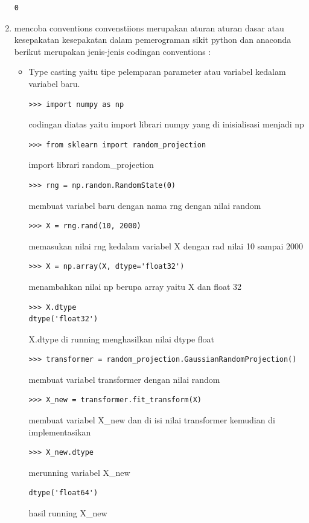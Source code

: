 \begin{enumerate}
\begin{verbatim}
0
\end{verbatim}
\item
mencoba conventions
convenstiions merupakan aturan aturan dasar atau kesepakatan kesepakatan dalam pemerograman sikit python dan anaconda berikut merupakan jenis-jenis codingan conventions :
\begin{itemize}
\item
Type casting yaitu tipe pelemparan parameter atau variabel kedalam variabel baru.
\begin{verbatim}
>>> import numpy as np
\end{verbatim}
codingan diatas yaitu import librari numpy yang di inisialisasi menjadi np
\begin{verbatim}
>>> from sklearn import random_projection
\end{verbatim}
import librari random\_projection
\begin{verbatim}
>>> rng = np.random.RandomState(0)
\end{verbatim}
membuat variabel baru dengan nama rng dengan nilai random
\begin{verbatim}
>>> X = rng.rand(10, 2000)
\end{verbatim}
memasukan nilai rng kedalam variabel X dengan rad nilai 10 sampai 2000
\begin{verbatim}
>>> X = np.array(X, dtype='float32')
\end{verbatim}
menambahkan nilai np berupa array yaitu X dan float 32 
\begin{verbatim}
>>> X.dtype
dtype('float32')
\end{verbatim}
X.dtype di running menghasilkan nilai dtype float
\begin{verbatim}
>>> transformer = random_projection.GaussianRandomProjection()
\end{verbatim}
membuat variabel transformer dengan nilai random
\begin{verbatim}
>>> X_new = transformer.fit_transform(X)
\end{verbatim}
membuat variabel X\_new dan di isi nilai transformer kemudian di implementasikan 
\begin{verbatim}
>>> X_new.dtype
\end{verbatim}
merunning variabel X\_new
\begin{verbatim}
dtype('float64')
\end{verbatim}
hasil running X\_new



\end{itemize}
\end{enumerate}
